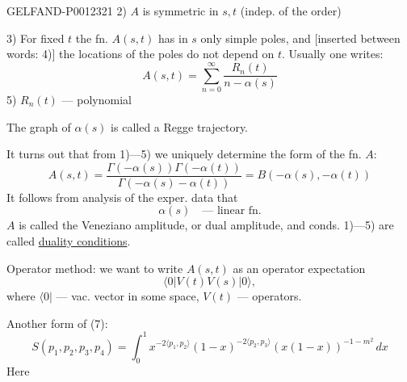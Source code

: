 \begin{GelfandAdjacentEvidence}{GELFAND-P001232}{1}
2) \(A\) is symmetric in \(s,t\) (indep. of the order)

3) For fixed \(t\) the fn. \(A(s,t)\) has in \(s\) only simple poles,
and [inserted between words: 4)] the locations of the poles do not depend on \(t\). Usually one writes:
\begin{equation*}
A(s,t)=\sum_{n=0}^{\infty}\frac{R_n(t)}{n-\alpha(s)}\tag{6}
\end{equation*}
5) \(R_n(t)\) --- polynomial

The graph of \(\alpha(s)\) is called a Regge trajectory.

It turns out that from 1)---5) we uniquely determine the form of the fn. \(A\):
\begin{equation*}
A(s,t)=\frac{\Gamma(-\alpha(s))\Gamma(-\alpha(t))}{\Gamma(-\alpha(s)-\alpha(t))}
=B(-\alpha(s),-\alpha(t))\tag{7}
\end{equation*}
It follows from analysis of the exper. data that
\begin{equation*}
\alpha(s)\quad\text{--- linear fn.}\tag{8}
\end{equation*}
\(A\) is called the Veneziano amplitude, or dual amplitude, and conds. 1)---5) are called \underline{duality conditions}.

Operator method: we want to write \(A(s,t)\) as an operator expectation
\begin{equation*}
\langle0|V(t)V(s)|0\rangle,\tag{9}
\end{equation*}
where \(\langle0|\) --- vac. vector in some space, \(V(t)\) --- operators.

Another form of (7):
\begin{equation*}
S(p_1,p_2,p_3,p_4)=\int_0^1
x^{-2\langle p_1,p_2\rangle}(1-x)^{-2\langle p_2,p_3\rangle}
(x(1-x))^{-1-m^2}\,dx\tag{10}
\end{equation*}
Here

\end{GelfandAdjacentEvidence}

